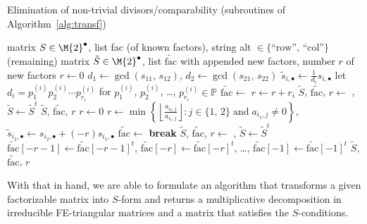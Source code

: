 \begin{breakablealgorithm}
\caption{Elimination of non-trivial divisors/comparability (subroutines of Algorithm~\ref{alg:transf})}\label{alg:elimination}
\begin{algorithmic}[1]
\Require matrix $S \in {\M{2}}^\bullet$, list fac (of known factors), string alt $\in \{ \text{``row''},\,\text{``col''} \}$
\Ensure (remaining) matrix $\tilde{S} \in {\M{2}}^\bullet$, list $\widetilde{\text{fac}}$ with appended new factors, number $r$ of new factors
\State $r \gets 0$
\State $d_1 \gets \gcd(s_{11},\,s_{12})$, $d_2 \gets \gcd(s_{21},\,s_{22})$
\State $\tilde{s}_{i,\bullet} \gets \frac{1}{d_i} s_{i,\bullet}$
\State let $d_i = p^{(i)}_1p^{(i)}_2\cdots p^{(i)}_{r_i}$ for $p^{(i)}_{1}$, $p^{(i)}_2$, \dots, $p^{(i)}_{r_i} \in \mathbb{P}$
\State $\widetilde{\text{fac}} \gets$ 
\State $r \gets r + r_i$
\EndIf
\EndFor
\Else {}
\State $\tilde{S}$, $\widetilde{\text{fac}}$, $r \gets$ , $\tilde{S} \gets \tilde{S}^t$
\EndIf
\State \Return $\tilde{S}$, $\widetilde{\text{fac}}$, $r$
\EndFunction
\Statex
{}
\State $r \gets 0$
\State $r \gets \min \left\{ \left\lfloor\frac{a_{i_2,j}}{a_{i_1,j}}\right\rfloor : j \in \{ 1, \, 2 \}\;\text{and}\;a_{i_1,j} \neq 0\right\}$, $\tilde{s}_{i_2,\bullet} \gets s_{i_2,\bullet} + (-r) s_{i_1,\bullet}$
\State $\widetilde{\text{fac}} \gets$ 
\State \textbf{break}
\EndIf
\EndFor
\Else {}
\State $\tilde{S}$, $\widetilde{\text{fac}}$, $r \gets$ , $\tilde{S} \gets \tilde{S}^t$
\State $\widetilde{\text{fac}}[-r-1] \gets \widetilde{\text{fac}}[-r-1]^t$, $\widetilde{\text{fac}}[-r] \gets \widetilde{\text{fac}}[-r]^t$, \dots,  $\widetilde{\text{fac}}[-1] \gets \widetilde{\text{fac}}[-1]^t$ 
\EndIf
\State \Return $\tilde{S}$, $\tilde{\text{fac}}$, $r$
\EndFunction
\end{algorithmic}
\end{breakablealgorithm}

With that in hand, we are able to formulate an algorithm that transforms a given factorizable matrix into $S$-form and returns a multiplicative decomposition in irreducible FE-triangular matrices and a matrix that satisfies the $S$-conditions. 

